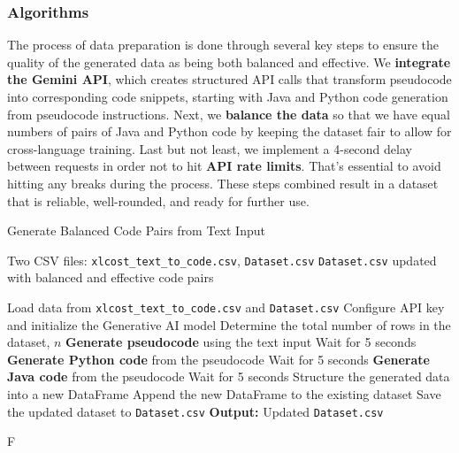 \documentclass{dhbenelux}
\begin{document}
\subsubsection{Algorithms}

The process of data preparation is done through several key steps to ensure the quality of the generated data as being both balanced and effective. We \textbf{integrate the Gemini API}, which creates structured API calls that transform pseudocode into corresponding code snippets, starting with Java and Python code generation from pseudocode instructions. Next, we \textbf{balance the data} so that we have equal numbers of pairs of Java and Python code by keeping the dataset fair to allow for cross-language training. Last but not least, we implement a 4-second delay between requests in order not to hit \textbf{API rate limits}. That's essential to avoid hitting any breaks during the process. These steps combined result in a dataset that is reliable, well-rounded, and ready for further use.

\begin{algorithm}
\caption{Generate Balanced Code Pairs from Text Input}
\label{alg:balanced_code_pairs}
\begin{algorithmic}[1]
\Require Two CSV files: \texttt{xlcost\_text\_to\_code.csv}, \texttt{Dataset.csv}
\Ensure \texttt{Dataset.csv} updated with balanced and effective code pairs

\State Load data from \texttt{xlcost\_text\_to\_code.csv} and \texttt{Dataset.csv}
\State Configure API key and initialize the Generative AI model
\State Determine the total number of rows in the dataset, $n$
    \State \textbf{Generate pseudocode} using the text input
    \State Wait for 5 seconds
    \State \textbf{Generate Python code} from the pseudocode
    \State Wait for 5 seconds
    \State \textbf{Generate Java code} from the pseudocode
    \State Wait for 5 seconds
    \State Structure the generated data into a new DataFrame
    \State Append the new DataFrame to the existing dataset
    \State Save the updated dataset to \texttt{Dataset.csv}
\EndFor
\State \textbf{Output:} Updated \texttt{Dataset.csv}
\end{algorithmic}F
\label{alg:generate-balanced-code}
\end{algorithm}
\end{document}
